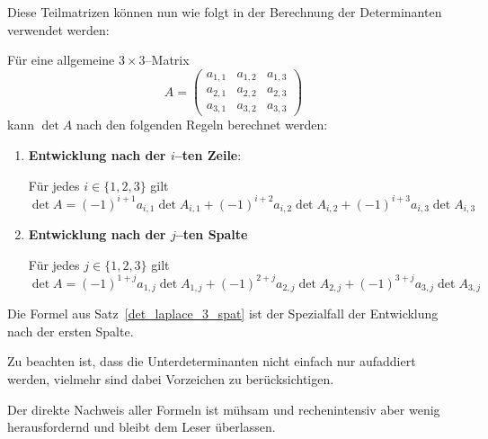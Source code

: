 \medbreak

Diese Teilmatrizen können nun wie folgt in der Berechnung der 
Determinanten verwendet werden:

\begin{satz}\label{det_laplace_3} 
Für eine allgemeine $3 \times 3$--Matrix
  	$$ A = \left( \begin{matrix} a_{1,1} & a_{1,2} & a_{1,3} \\ a_{2,1} & a_{2,2} & a_{2,3} \\
	a_{3,1} & a_{3,2} & a_{3,3} \end{matrix} \right) $$
kann $\det{A}$ nach den folgenden Regeln berechnet werden:

\begin{enumerate}
\item \textbf{Entwicklung nach der $i$--ten Zeile}:

Für jedes $i \in \{1, 2,3 \}$ gilt
  	$$ \det{A} = (-1)^{i+1} a_{i,1}  \det{A_{i,1}} + (-1)^{i+2} a_{i,2}  \det{A_{i,2}} + 
	(-1)^{i+3} a_{i,3}  \det{A_{i,3}}  $$

\item \textbf{Entwicklung nach der $j$--ten Spalte}

Für jedes $j \in \{1, 2, 3 \}$ gilt
  	$$ \det{A} = (-1)^{1+j} a_{1,j} \det{A_{1,j}} + (-1)^{2+j} a_{2,j} \det{A_{2,j}} + 
	(-1)^{3+j} a_{3,j} \det{A_{3,j}}  $$
\end{enumerate}
\end{satz}

\begin{notiz} Die Formel aus Satz~\ref{det_laplace_3_spat} ist der Spezialfall der Entwicklung nach 
der ersten Spalte.

Zu beachten ist, dass die Unterdeterminanten nicht einfach nur aufaddiert werden, vielmehr sind dabei 
Vorzeichen zu berücksichtigen.
\end{notiz}

\beweis Der direkte Nachweis aller Formeln ist mühsam und rechenintensiv aber wenig herausfordernd und 
bleibt dem Leser überlassen.

\medbreak

